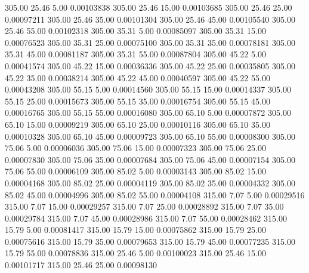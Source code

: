     305.00     25.46      5.00     0.00103838
    305.00     25.46     15.00     0.00103685
    305.00     25.46     25.00     0.00097211
    305.00     25.46     35.00     0.00101304
    305.00     25.46     45.00     0.00105540
    305.00     25.46     55.00     0.00102318
    305.00     35.31      5.00     0.00085097
    305.00     35.31     15.00     0.00076523
    305.00     35.31     25.00     0.00075100
    305.00     35.31     35.00     0.00078181
    305.00     35.31     45.00     0.00081187
    305.00     35.31     55.00     0.00087804
    305.00     45.22      5.00     0.00041574
    305.00     45.22     15.00     0.00036336
    305.00     45.22     25.00     0.00035805
    305.00     45.22     35.00     0.00038214
    305.00     45.22     45.00     0.00040597
    305.00     45.22     55.00     0.00043208
    305.00     55.15      5.00     0.00014560
    305.00     55.15     15.00     0.00014337
    305.00     55.15     25.00     0.00015673
    305.00     55.15     35.00     0.00016754
    305.00     55.15     45.00     0.00016765
    305.00     55.15     55.00     0.00016080
    305.00     65.10      5.00     0.00007872
    305.00     65.10     15.00     0.00009219
    305.00     65.10     25.00     0.00010116
    305.00     65.10     35.00     0.00010328
    305.00     65.10     45.00     0.00009723
    305.00     65.10     55.00     0.00008300
    305.00     75.06      5.00     0.00006036
    305.00     75.06     15.00     0.00007323
    305.00     75.06     25.00     0.00007830
    305.00     75.06     35.00     0.00007684
    305.00     75.06     45.00     0.00007154
    305.00     75.06     55.00     0.00006109
    305.00     85.02      5.00     0.00003143
    305.00     85.02     15.00     0.00004168
    305.00     85.02     25.00     0.00004119
    305.00     85.02     35.00     0.00004332
    305.00     85.02     45.00     0.00004996
    305.00     85.02     55.00     0.00004108
    315.00      7.07      5.00     0.00029516
    315.00      7.07     15.00     0.00029257
    315.00      7.07     25.00     0.00028892
    315.00      7.07     35.00     0.00029784
    315.00      7.07     45.00     0.00028986
    315.00      7.07     55.00     0.00028462
    315.00     15.79      5.00     0.00081417
    315.00     15.79     15.00     0.00075862
    315.00     15.79     25.00     0.00075616
    315.00     15.79     35.00     0.00079653
    315.00     15.79     45.00     0.00077235
    315.00     15.79     55.00     0.00078836
    315.00     25.46      5.00     0.00100023
    315.00     25.46     15.00     0.00101717
    315.00     25.46     25.00     0.00098130
